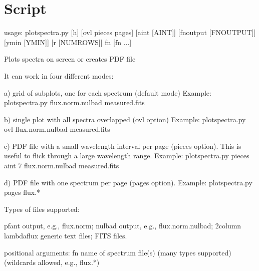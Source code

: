 \documentclass[letterpaper,10pt,english]{sphinxmanual}
\begin{document}
\section{Script }
\label{\detokenize{autoscripts/script-plot-spectra:script-plot-spectra-py}}\label{\detokenize{autoscripts/script-plot-spectra::doc}}
\begin{sphinxVerbatim}[commandchars=\\\{\}]
usage: plot\PYGZhy{}spectra.py [\PYGZhy{}h] [\PYGZhy{}\PYGZhy{}ovl \textbar{} \PYGZhy{}\PYGZhy{}pieces \textbar{} \PYGZhy{}\PYGZhy{}pages] [\PYGZhy{}\PYGZhy{}aint [AINT]]
                       [\PYGZhy{}\PYGZhy{}fn\PYGZus{}output [FN\PYGZus{}OUTPUT]] [\PYGZhy{}\PYGZhy{}ymin [YMIN]]
                       [\PYGZhy{}r [NUM\PYGZus{}ROWS]]
                       fn [fn ...]

Plots spectra on screen or creates PDF file

It can work in four different modes:

a) grid of sub\PYGZhy{}plots, one for each spectrum (default mode)
   Example:
   plot\PYGZhy{}spectra.py flux.norm.nulbad measured.fits

b) single plot with all spectra overlapped (\PYGZdq{}\PYGZhy{}\PYGZhy{}ovl\PYGZdq{} option)
   Example:
   \PYGZgt{} plot\PYGZhy{}spectra.py \PYGZhy{}\PYGZhy{}ovl flux.norm.nulbad measured.fits

c) PDF file with a small wavelength interval per page (\PYGZdq{}\PYGZhy{}\PYGZhy{}pieces\PYGZdq{} option).
   This is useful to flick through a large wavelength range.
   Example:
   \PYGZgt{} plot\PYGZhy{}spectra.py \PYGZhy{}\PYGZhy{}pieces \PYGZhy{}\PYGZhy{}aint 7 flux.norm.nulbad measured.fits

d) PDF file with one spectrum per page (\PYGZdq{}\PYGZhy{}\PYGZhy{}pages\PYGZdq{} option).
   Example:
   \PYGZgt{} plot\PYGZhy{}spectra.py \PYGZhy{}\PYGZhy{}pages flux.*

Types of files supported:

  \PYGZhy{} pfant output, e.g., flux.norm;
  \PYGZhy{} nulbad output, e.g., flux.norm.nulbad;
  \PYGZhy{} 2\PYGZhy{}column \PYGZdq{}lambda\PYGZhy{}flux\PYGZdq{} generic text files;
  \PYGZhy{} FITS files.

positional arguments:
  fn                    name of spectrum file(s) (many types supported)
                        (wildcards allowed, e.g., \PYGZdq{}flux.*\PYGZdq{})


\end{sphinxVerbatim}
\end{document}
